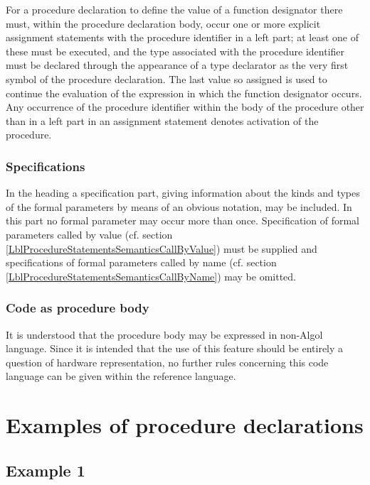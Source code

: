 \documentclass[a4paper,11pt]{article}
\begin{document}
For a procedure declaration to define the value of a function
designator there must, within the procedure declaration body, occur
one or more explicit assignment statements with the procedure
identifier in a left part; at least one of these must be executed, and
the type associated with the procedure identifier must be declared
through the appearance of a type declarator as the very first symbol
of the procedure declaration.  The last value so assigned is used to
continue the evaluation of the expression in which the function
designator occurs.  Any occurrence of the procedure identifier within
the body of the procedure other than in a left part in an assignment
statement denotes activation of the procedure.

\subsubsection{Specifications}
\label{LblProcedureDeclarationsSpecifications}

In the heading a specification part, giving information about the
kinds and types of the formal parameters by means of an obvious
notation, may be included.  In this part no formal parameter may occur
more than once.  Specification of formal parameters called by value
(cf. section \ref{LblProcedureStatementsSemanticsCallByValue}) must be
supplied and specifications of formal parameters called by name (cf.
section \ref{LblProcedureStatementsSemanticsCallByName}) may be
omitted.

\subsubsection{Code as procedure body}
\label{LblProcedureDeclarationsCodeAsProcedureBody}

It is understood that the procedure body may be expressed in non-Algol
language.  Since it is intended that the use of this feature should be
entirely a question of hardware representation, no further rules
concerning this code language can be given within the reference
language.



\section{Examples of procedure declarations}

\subsection{Example 1}
\end{document}
